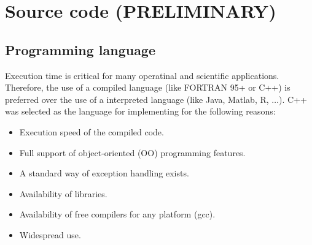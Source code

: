 \chapter{Source code (PRELIMINARY)} \label{chap:code}
\renewcommand{\tabdir}{chapters/code/tab}
\renewcommand{\figdir}{chapters/code/fig}

\section{Programming language} \label{sec:code-language}

Execution time is critical for many operatinal and scientific applications. Therefore, the use of a compiled language (like FORTRAN 95+ or C++) is preferred over the use of a interpreted language (like Java, Matlab, R, $\ldots$). C++ was selected as the language for implementing  for the following reasons:

\begin{itemize}
  \item Execution speed of the compiled code.
  \item Full support of object-oriented (OO) programming features.
  \item A standard way of exception handling exists.
  \item Availability of libraries.
  \item Availability of free compilers for any platform (gcc).
  \item Widespread use.
\end{itemize}


